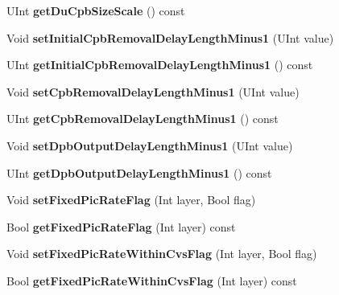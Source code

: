 \begin{DoxyCompactItemize}
U\+Int {\bfseries get\+Du\+Cpb\+Size\+Scale} () const
\item 
\mbox{\label{class_t_com_h_r_d_a4ad7597220eeb58975dca0d42b758abe}} 
Void {\bfseries set\+Initial\+Cpb\+Removal\+Delay\+Length\+Minus1} (U\+Int value)
\item 
\mbox{\label{class_t_com_h_r_d_a4634f711689da0191279da01cb1106f9}} 
U\+Int {\bfseries get\+Initial\+Cpb\+Removal\+Delay\+Length\+Minus1} () const
\item 
\mbox{\label{class_t_com_h_r_d_a0438089812b1a6416a706e0d24f6284e}} 
Void {\bfseries set\+Cpb\+Removal\+Delay\+Length\+Minus1} (U\+Int value)
\item 
\mbox{\label{class_t_com_h_r_d_a1631e05f98ea4d9379dba6fdda624f46}} 
U\+Int {\bfseries get\+Cpb\+Removal\+Delay\+Length\+Minus1} () const
\item 
\mbox{\label{class_t_com_h_r_d_ae1ff5d27116d01e11b005d42e59e9f25}} 
Void {\bfseries set\+Dpb\+Output\+Delay\+Length\+Minus1} (U\+Int value)
\item 
\mbox{\label{class_t_com_h_r_d_a860323ac91708bc7b896718591255c90}} 
U\+Int {\bfseries get\+Dpb\+Output\+Delay\+Length\+Minus1} () const
\item 
\mbox{\label{class_t_com_h_r_d_a3adc2c601f84dfe01128b77f4b4a9eb6}} 
Void {\bfseries set\+Fixed\+Pic\+Rate\+Flag} (Int layer, Bool flag)
\item 
\mbox{\label{class_t_com_h_r_d_a8dbb58b70a544c08acef852ecdf40230}} 
Bool {\bfseries get\+Fixed\+Pic\+Rate\+Flag} (Int layer) const
\item 
\mbox{\label{class_t_com_h_r_d_ae495b8f6dc9bfca59e6d03435dcddb08}} 
Void {\bfseries set\+Fixed\+Pic\+Rate\+Within\+Cvs\+Flag} (Int layer, Bool flag)
\item 
\mbox{\label{class_t_com_h_r_d_add035dc9c24ace6ed67618a40c6893d2}} 
Bool {\bfseries get\+Fixed\+Pic\+Rate\+Within\+Cvs\+Flag} (Int layer) const
\item 

\end{DoxyCompactItemize}
